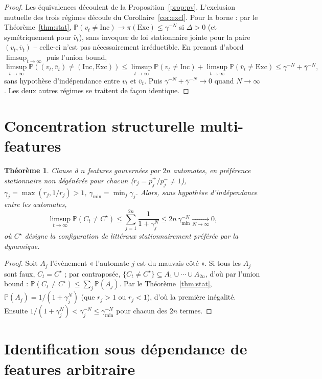 \documentclass[12pt,a4paper]{article}
\newtheorem{theorem}{Théorème}
\theoremstyle{remark}
\newcommand{\Inc}{\ensuremath{\mathrm{Inc}}}
\newcommand{\Exc}{\ensuremath{\mathrm{Exc}}}
\newcommand{\vbar}{\bar{v}}
\begin{document}
\begin{proof}
Les équivalences découlent de la Proposition~\ref{prop:pv}. L'exclusion
mutuelle des trois régimes découle du Corollaire~\ref{cor:excl}. Pour la
borne : par le Théorème~\ref{thm:stat}, $\mathbb P(v_t\ne\Inc)\to\pi(\Exc)\le\gamma^{-N}$
si $\Delta>0$ (et symétriquement pour $\vbar_t$), sans invoquer de loi
stationnaire jointe pour la paire $(v_t,\vbar_t)$ -- celle-ci n'est pas
nécessairement irréductible. En prenant d'abord $\limsup_{t\to\infty}$ puis
l'union bound,
\[
  \limsup_{t\to\infty}\mathbb P((v_t,\vbar_t)\ne(\Inc,\Exc))
  \le \limsup_{t\to\infty}\mathbb P(v_t\ne\Inc)+\limsup_{t\to\infty}\mathbb P(\vbar_t\ne\Exc)
  \le \gamma^{-N}+\bar\gamma^{-N},
\]
sans hypothèse d'indépendance entre $v_t$ et $\vbar_t$. Puis
$\gamma^{-N}+\bar\gamma^{-N}\to0$ quand $N\to\infty$. Les deux autres
régimes se traitent de façon identique.
\end{proof}

\section{Concentration structurelle multi-features}

\begin{theorem}\label{thm:multi}
Clause à $n$ features gouvernées par $2n$ automates, en préférence
stationnaire non dégénérée pour chacun ($r_j=p_j^+/p_j^-\ne1$),
$\gamma_j=\max(r_j,1/r_j)>1$, $\gamma_{\min}=\min_j\gamma_j$. Alors, sans
hypothèse d'indépendance entre les automates,
\[
  \limsup_{t\to\infty}\mathbb P(C_t\ne C^\star) \le \sum_{j=1}^{2n}\frac1{1+\gamma_j^N}
  \le 2n\,\gamma_{\min}^{-N} \xrightarrow[N\to\infty]{} 0,
\]
où $C^\star$ désigne la configuration de littéraux stationnairement
préférée par la dynamique.
\end{theorem}

\begin{proof}
Soit $A_j$ l'évènement « l'automate $j$ est du mauvais côté ». Si tous les
$A_j$ sont faux, $C_t=C^\star$ ; par contraposée,
$\{C_t\ne C^\star\}\subseteq A_1\cup\cdots\cup A_{2n}$, d'où par l'union
bound : $\mathbb P(C_t\ne C^\star)\le\sum_j\mathbb P(A_j)$. Par le
Théorème~\ref{thm:stat}, $\mathbb P(A_j)=1/(1+\gamma_j^N)$ (que $r_j>1$ ou
$r_j<1$), d'où la première inégalité. Ensuite $1/(1+\gamma_j^N)<\gamma_j^{-N}\le\gamma_{\min}^{-N}$
pour chacun des $2n$ termes.
\end{proof}

\section{Identification sous dépendance de features arbitraire}
\end{document}
